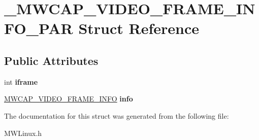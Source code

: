 \hypertarget{struct__MWCAP__VIDEO__FRAME__INFO__PAR}{\section{\-\_\-\-M\-W\-C\-A\-P\-\_\-\-V\-I\-D\-E\-O\-\_\-\-F\-R\-A\-M\-E\-\_\-\-I\-N\-F\-O\-\_\-\-P\-A\-R Struct Reference}
\label{struct__MWCAP__VIDEO__FRAME__INFO__PAR}
}
\subsection*{Public Attributes}
\begin{DoxyCompactItemize}
\item 
\hypertarget{struct__MWCAP__VIDEO__FRAME__INFO__PAR_a3d5dc113b829bedbf831e3b156dca948}{int {\bfseries iframe}}\label{struct__MWCAP__VIDEO__FRAME__INFO__PAR_a3d5dc113b829bedbf831e3b156dca948}

\item 
\hypertarget{struct__MWCAP__VIDEO__FRAME__INFO__PAR_af94c6911d7ea3c089a78652eae85fe69}{\hyperlink{struct__MWCAP__VIDEO__FRAME__INFO}{M\-W\-C\-A\-P\-\_\-\-V\-I\-D\-E\-O\-\_\-\-F\-R\-A\-M\-E\-\_\-\-I\-N\-F\-O} {\bfseries info}}\label{struct__MWCAP__VIDEO__FRAME__INFO__PAR_af94c6911d7ea3c089a78652eae85fe69}

\end{DoxyCompactItemize}


The documentation for this struct was generated from the following file\-:\begin{DoxyCompactItemize}
\item 
M\-W\-Linux.\-h\end{DoxyCompactItemize}
